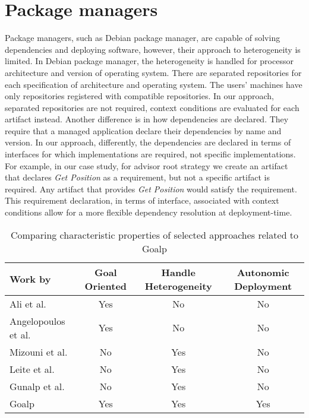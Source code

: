 \section{Package managers}
Package managers, such as Debian package manager\cite{aoki_debian_2016}, are capable of solving dependencies and deploying software, however, their approach to heterogeneity is limited. In Debian package manager, the heterogeneity is handled for processor architecture and version of operating system. There are separated repositories for each specification of architecture and operating system. The users' machines have only repositories registered with compatible repositories.
In our approach, separated repositories are not required, context conditions are evaluated for each artifact instead.
Another difference is in how dependencies are declared. They require that a managed application declare their dependencies by name and version. In our approach, differently, the dependencies are declared in terms of interfaces for which implementations are required, not specific implementations. For example, in our case study, for advisor root strategy we create an artifact that declares \emph{Get Position} as a requirement, but not a specific artifact is required. Any artifact that provides \emph{Get Position} would satisfy the requirement. This requirement declaration, in terms of interface, associated with context conditions allow
for a more flexible dependency resolution at deployment-time.

\begin{table*}[!ht]
\centering
\caption{Comparing characteristic properties of selected approaches related to Goalp}
\label{table_related_works}
\begin{tabular}{p{4cm} ccc}
\toprule
Work by &
   Goal Oriented &
    Handle Heterogeneity &
    Autonomic Deployment \\
\midrule
Ali et al.\citep{ali_requirements-driven_2014} & \cellcolor{blue!10} Yes & No & No \\
Angelopoulos et al. \cite{angelopoulos_capturing_2015} & \cellcolor{blue!10}Yes & No & No \\
Mizouni et al. \citep{mizouni_framework_2014} & No & \cellcolor{blue!10} Yes & No \\
Leite et al. \citep{ferreira_leite_user_2014}  & No & \cellcolor{blue!10} Yes & No \\
Gunalp et al.\citep{gunalp_rondo_2015} & No & \cellcolor{blue!10} Yes  &  No\\
Goalp & \cellcolor{blue!10} Yes & \cellcolor{blue!10} Yes & \cellcolor{blue!10} Yes \\
\bottomrule
\end{tabular}
\end{table*}

